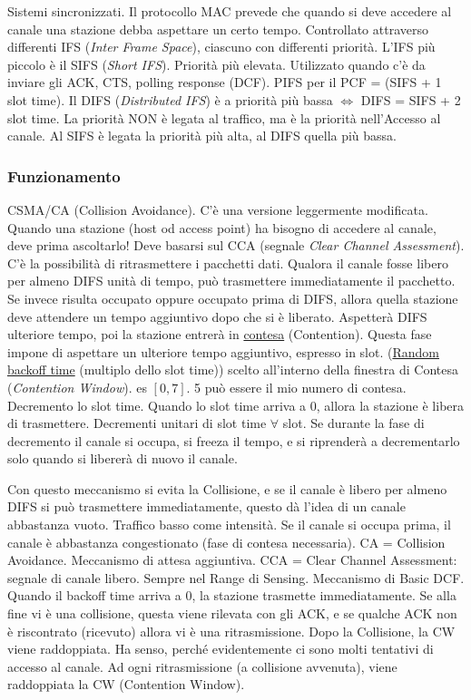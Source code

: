 Sistemi sincronizzati. Il protocollo MAC prevede che quando si deve accedere al canale una stazione debba aspettare un certo tempo. Controllato attraverso differenti IFS (\textit{Inter Frame Space}), ciascuno con differenti priorità. L'IFS più piccolo è il SIFS (\textit{Short IFS}). Priorità più elevata. Utilizzato quando c'è da inviare gli ACK, CTS, polling response (DCF). PIFS per il PCF = (SIFS + 1 slot time). Il DIFS (\textit{Distributed IFS}) è a priorità più bassa $\iff$ DIFS = SIFS + 2 slot time. La priorità NON è legata al traffico, ma è la priorità nell'Accesso al canale. Al SIFS è legata la priorità più alta, al DIFS quella più bassa.

\subsubsection{Funzionamento}

CSMA/CA (Collision Avoidance). C'è una versione leggermente modificata. Quando una stazione (host od access point) ha bisogno di accedere al canale, deve prima ascoltarlo! Deve basarsi sul CCA (segnale \textit{Clear Channel Assessment}). C'è la possibilità di ritrasmettere i pacchetti dati. Qualora il canale fosse libero per almeno DIFS unità di tempo, può trasmettere immediatamente il pacchetto. Se invece risulta occupato oppure occupato prima di DIFS, allora quella stazione deve attendere un tempo aggiuntivo dopo che si è liberato. Aspetterà DIFS ulteriore tempo, poi la stazione entrerà in \underline{contesa} (Contention). Questa fase impone di aspettare un ulteriore tempo aggiuntivo, espresso in slot. (\underline{Random backoff time} (multiplo dello slot time)) scelto all'interno della finestra di Contesa (\textit{Contention Window}). es $[0,7]$. 5 può essere il mio numero di contesa. Decremento lo slot time. Quando lo slot time arriva a 0, allora la stazione è libera di trasmettere. Decrementi unitari di slot time $\forall$ slot. Se durante la fase di decremento il canale si occupa, si freeza il tempo, e si riprenderà a decrementarlo solo quando si libererà di nuovo il canale.

Con questo meccanismo si evita la Collisione, e se il canale è libero per almeno DIFS si può trasmettere immediatamente, questo dà l'idea di un canale abbastanza vuoto. Traffico basso come intensità. Se il canale si occupa prima, il canale è abbastanza congestionato (fase di contesa necessaria). CA = Collision Avoidance. Meccanismo di attesa aggiuntiva. CCA = Clear Channel Assessment: segnale di canale libero. Sempre nel Range di Sensing. Meccanismo di Basic DCF. Quando il backoff time arriva a 0, la stazione trasmette immediatamente. Se alla fine vi è una collisione, questa viene rilevata con gli ACK, e se qualche ACK non è riscontrato (ricevuto) allora vi è una ritrasmissione. Dopo la Collisione, la CW viene raddoppiata. Ha senso, perché evidentemente ci sono molti tentativi di accesso al canale. Ad ogni ritrasmissione (a collisione avvenuta), viene raddoppiata la CW (Contention Window).

